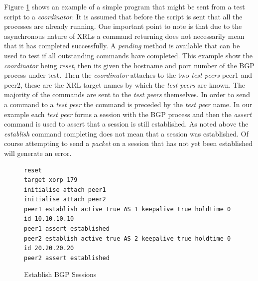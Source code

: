 \documentclass[11pt]{article}
\newcommand{\coordinator}{{\em coordinator}\xspace}
\newcommand{\testpeer}{{\em test peer}\xspace}
\newcommand{\testpeers}{{\em test peers}\xspace}
\begin{document}
Figure \ref{prog:simple} shows an example of a simple program that
might be sent from a test script to a \coordinator. It is assumed that
before the script is sent that all the processes are already running.
One important point to note is that due to the asynchronous nature of
XRLs a command returning does not necessarily mean that it has
completed successfully. A {\em pending} method is available that can
be used to test if all outstanding commands have completed. This
example show the \coordinator being {\em reset}, then its given the
hostname and port number of the BGP process under test. Then the
\coordinator attaches to the two
\testpeers peer1 and peer2, these are the XRL target names by which the
\testpeers are known. The majority of the commands are sent to the
\testpeers themselves. In order to send a command to a \testpeer the
command is preceded by the \testpeer name. In our example each
\testpeer forms a session with the BGP process and then the {\em
  assert} command is used to assert that a session is still
established. As noted above the {\em establish} command completing
does not mean that a session was established. Of course attempting to
send a {\em packet} on a session that has not yet been established
will generate an error.

\begin{figure}
\small
\begin{verbatim}
reset
target xorp 179
initialise attach peer1
initialise attach peer2
peer1 establish active true AS 1 keepalive true holdtime 0 id 10.10.10.10
peer1 assert established
peer2 establish active true AS 2 keepalive true holdtime 0 id 20.20.20.20
peer2 assert established
\end{verbatim}
\caption{\label{prog:simple}Establish BGP Sessions}
\end{figure}

\end{document}
